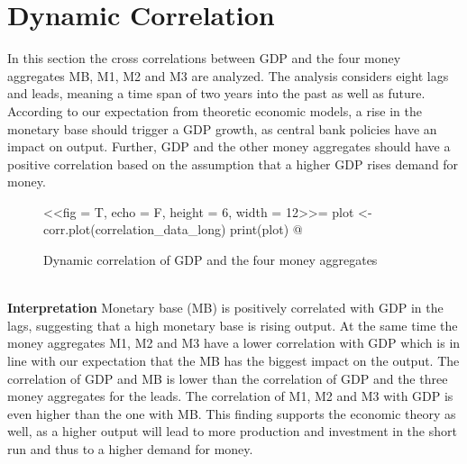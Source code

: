 \documentclass[11pt,a4paper]{report}
\begin{document}
\section{Dynamic Correlation}

In this section the cross correlations between GDP and the four money aggregates MB, M1, M2 and M3 are analyzed. The analysis considers eight lags and leads, meaning a time span of two years into the past as well as future. According to our expectation from theoretic economic models, a rise in the monetary base should trigger a GDP growth, as central bank policies have an impact on output. Further, GDP and the other money aggregates should have a positive correlation based on the assumption that a higher GDP rises demand for money.

\begin{figure}[H]
\caption{Dynamic correlation of GDP and the four money aggregates}
\label{dyn_corr}
\centering
<<fig = T, echo = F, height = 6, width = 12>>=
plot <- corr.plot(correlation_data_long)
print(plot)
@
\end{figure} \ \\\textbf{Interpretation}
\newline
Monetary base (MB) is positively correlated with GDP in the lags, suggesting that a high monetary base is rising output. At the same time the money aggregates M1, M2 and M3 have a lower correlation with GDP which is in line with our expectation that the MB has the biggest impact on the output.
\newline
The correlation of GDP and MB is lower than the correlation of GDP and the three money aggregates for the leads. The correlation of M1, M2 and M3 with GDP is even higher than the one with MB. This finding supports the economic theory as well, as a higher output will lead to more production and investment in the short run and thus to a higher demand for money. 


\newpage
\end{document}
